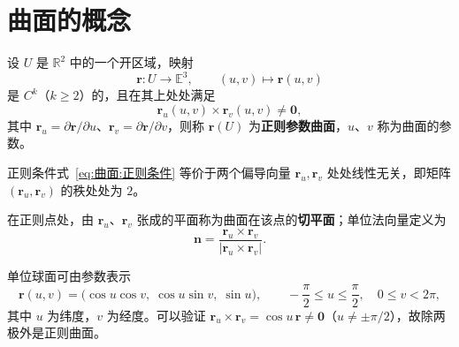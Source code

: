 
\section{曲面的概念}

\begin{definition}[正则曲面]
	设 $U$ 是 $\mathbb{R}^2$ 中的一个开区域，映射
	\begin{equation}
		\boldsymbol{r}:U\longrightarrow\mathbb{E}^3,\qquad
		(u,v)\longmapsto\boldsymbol{r}(u,v)
		\label{eq:曲面:定义}
	\end{equation}
	是 $C^k$（$k\geqslant2$）的，且在其上处处满足
	\begin{equation}
		\boldsymbol{r}_u(u,v)\times\boldsymbol{r}_v(u,v)\neq\boldsymbol{0},
		\label{eq:曲面:正则条件}
	\end{equation}
	其中 $\boldsymbol{r}_u=\partial\boldsymbol{r}/\partial u$、$\boldsymbol{r}_v=\partial\boldsymbol{r}/\partial v$，则称 $\boldsymbol{r}(U)$ 为\textbf{正则参数曲面}，$u$、$v$ 称为曲面的参数。
\end{definition}

正则条件式~\eqref{eq:曲面:正则条件} 等价于两个偏导向量 $\boldsymbol{r}_u,\boldsymbol{r}_v$ 处处线性无关，即矩阵 $(\boldsymbol{r}_u,\boldsymbol{r}_v)$ 的秩处处为 $2$。

\begin{definition}[切平面与法向量]
	在正则点处，由 $\boldsymbol{r}_u$、$\boldsymbol{r}_v$ 张成的平面称为曲面在该点的\textbf{切平面}；单位法向量定义为
	\begin{equation}
		\mathbf{n}=\frac{\boldsymbol{r}_u\times\boldsymbol{r}_v}
		{\left|\boldsymbol{r}_u\times\boldsymbol{r}_v\right|}.
		\label{eq:曲面:单位法向量}
	\end{equation}
\end{definition}

\begin{example}[球面]
	单位球面可由参数表示
	\begin{equation}
		\boldsymbol{r}(u,v)=\bigl(\cos u\cos v,\;\cos u\sin v,\;\sin u\bigr),
		\qquad -\frac{\pi}{2}\leqslant u\leqslant\frac{\pi}{2},\quad 0\leqslant v<2\pi,
		\label{eq:球面:参数表示}
	\end{equation}
	其中 $u$ 为纬度，$v$ 为经度。可以验证 $\boldsymbol{r}_u\times\boldsymbol{r}_v=\cos u\,\boldsymbol{r}\neq\boldsymbol{0}$（$u\neq\pm\pi/2$），故除两极外是正则曲面。
\end{example}

